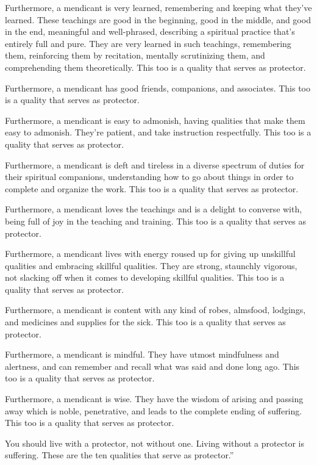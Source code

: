 \documentclass[12pt,openany]{book}%
\begin{document}
Furthermore, a mendicant is very learned, remembering and keeping what they’ve learned. These teachings are good in the beginning, good in the middle, and good in the end, meaningful and well-phrased, describing a spiritual practice that’s entirely full and pure. They are very learned in such teachings, remembering them, reinforcing them by recitation, mentally scrutinizing them, and comprehending them theoretically. This too is a quality that serves as protector. 

Furthermore, a mendicant has good friends, companions, and associates. This too is a quality that serves as protector. 

Furthermore, a mendicant is easy to admonish, having qualities that make them easy to admonish. They’re patient, and take instruction respectfully. This too is a quality that serves as protector. 

Furthermore, a mendicant is deft and tireless in a diverse spectrum of duties for their spiritual companions, understanding how to go about things in order to complete and organize the work. This too is a quality that serves as protector. 

Furthermore, a mendicant loves the teachings and is a delight to converse with, being full of joy in the teaching and training. This too is a quality that serves as protector. 

Furthermore, a mendicant lives with energy roused up for giving up unskillful qualities and embracing skillful qualities. They are strong, staunchly vigorous, not slacking off when it comes to developing skillful qualities. This too is a quality that serves as protector. 

Furthermore, a mendicant is content with any kind of robes, almsfood, lodgings, and medicines and supplies for the sick. This too is a quality that serves as protector. 

Furthermore, a mendicant is mindful. They have utmost mindfulness and alertness, and can remember and recall what was said and done long ago. This too is a quality that serves as protector. 

Furthermore, a mendicant is wise. They have the wisdom of arising and passing away which is noble, penetrative, and leads to the complete ending of suffering. This too is a quality that serves as protector. 

You should live with a protector, not without one. Living without a protector is suffering. These are the ten qualities that serve as protector.” 
\end{document}
